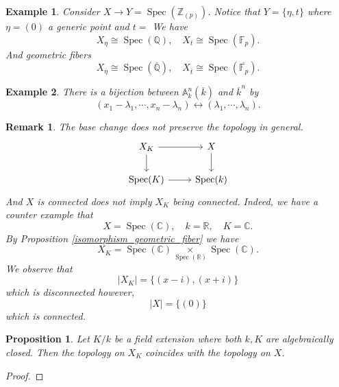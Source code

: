 \documentclass{article}
\newtheorem{proposition}{Proposition}[section]
\newtheorem{remark}{Remark}[section]
\newtheorem{example}{Example}[section]
\numberwithin{equation}{section}
\DeclareMathOperator{\Spec}{Spec}
\newcommand{\fib}[1]{%
  \mathbin{\mathop{\times}\limits_{#1}}%
}
\begin{document}
\begin{example}
Consider $X\to Y = \Spec(\mathbb{Z}_{(p)})$. Notice that $Y = \{\eta,t\}$ where $\eta=(0)$ a generic point and $t=$%
We have 
\begin{equation*}
X_\eta \cong\Spec(\mathbb{Q}),\quad X_t\cong\Spec(\mathbb{F}_p).
\end{equation*}
And geometric fibers
\begin{equation*}
X_{\overline{\eta}} \cong\Spec(\overline{\mathbb{Q}}),\quad X_{\overline{t}}\cong\Spec(\overline{\mathbb{F}_p}).
\end{equation*}
\end{example}

\begin{example}
There is a bijection between $\mathbb{A}^n_k(\overline{k})$ and $\overline{k}^n$ by
\begin{equation*}
(x_1-\lambda_1,\cdots,x_n-\lambda_n) \leftrightarrow (\lambda_1,\cdots,\lambda_n).
\end{equation*}
\end{example}

\begin{remark}
The base change does not preserve the topology in general.
\[
\begin{tikzcd}
X_K \arrow[d] \arrow[r] & X \arrow[d] \\
\Spec(K) \arrow[r]      & \Spec(k)   
\end{tikzcd}
\]
And $X$ is connected does not imply $X_K$ being connected.
Indeed, we have a counter example that
\begin{equation*}
X = \Spec(\mathbb{C}),\quad k =\mathbb{R}, \quad K=\mathbb{C}.
\end{equation*}
By Proposition \ref{isomorphism_geometric_fiber} we have
\begin{equation*}
X_K = \Spec(\mathbb{C})\fib{\Spec(\mathbb{R})}\Spec(\mathbb{C}).
\end{equation*}
We observe that 
\begin{equation*}
|X_K| = \{(x-i),(x+i)\}
\end{equation*}
which is disconnected however,
\begin{equation*}
|X| = \{(0)\}
\end{equation*}
which is connected.
\end{remark}

\begin{proposition}
Let $K/k$ be a field extension where both $k,K$ are algebraically closed. Then the topology on $X_K$ coincides with the topology on $X$.%
\end{proposition}
\begin{proof}
\end{proof}
\end{document}
